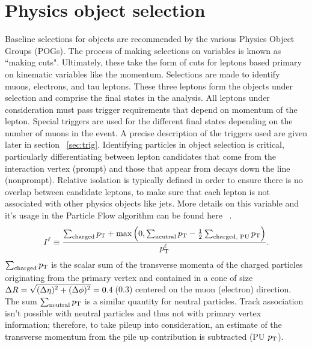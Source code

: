 \section{Physics object selection} 
\label{sec:objsel}
Baseline selections for objects are recommended by the various Physics Object Groups (POGs). The process of making selections on variables is known as ``making cuts". Ultimately, these take the form of cuts for leptons based primary on kinematic variables like the momentum. 
Selections are made to identify muons, electrons, and tau leptons. These three leptons form the objects under selection and comprise the final states in the analysis.
All leptons under consideration must pass trigger requirements that depend on momentum of the lepton. Special triggers are used for the different final states depending on the number of muons in the event. A precise description of the triggers used are given later in section ~\ref{sec:trig}.
Identifying particles in object selection is critical, particularly differentiating between lepton candidates that come from the interaction vertex (prompt) and those that appear from decays down the line (nonprompt). Relative isolation is typically defined in order to ensure there is no overlap between candidate leptons, to make sure that each lepton is not associated with other physics objects like jets. More details on this variable and it's usage in the Particle Flow algorithm can be found here  ~\cite{Sirunyan_2017}. 
\begin{equation}
I^{\ell} \equiv \frac{\sum_\text{charged}  p_{\mathrm{T}} + \max\left( 0, \sum_\text{neutral}  p_{\mathrm{T}}
                                         - \frac{1}{2} \sum_\text{charged, PU} p_{\mathrm{T}}  \right )}{p_{\mathrm{T}}^{\ell}}.
\label{eq:reconstruction_isolation}
\end{equation}
$\sum_\text{charged}  p_{\mathrm{T}}$ is the scalar sum of the
transverse momenta of the charged particles originating from
the primary vertex and contained in a cone of size
$\Delta R = \sqrt{\smash[b]{(\Delta \eta)^2 + (\Delta \phi)^2}} = 0.4$\,(0.3)
centered on the muon (electron) direction. The sum $\sum_\text{neutral}  p_{\mathrm{T}}$ is
a similar quantity for neutral particles. Track association isn't possible with neutral particles and thus not with primary vertex information; therefore, to take pileup into consideration, an estimate of the transverse momentum from the pile up contribution is subtracted (PU $p_{\mathrm{T}}$).  

